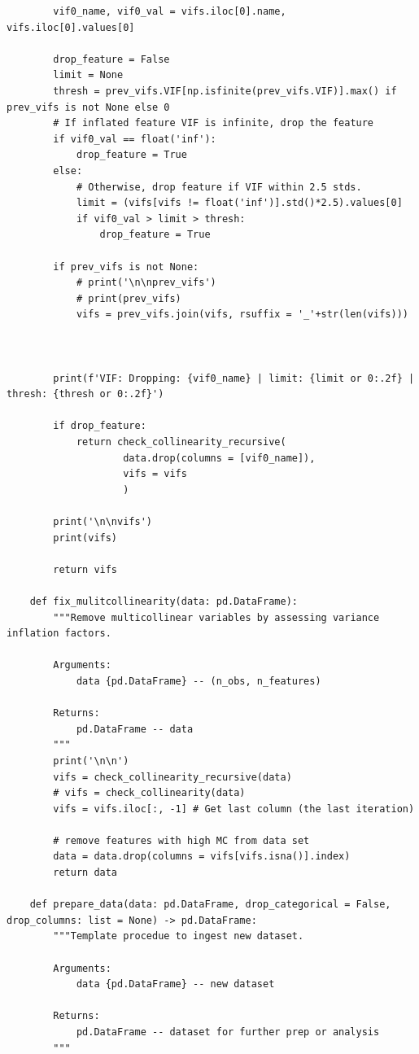 \begin{verbatim}
        vif0_name, vif0_val = vifs.iloc[0].name, vifs.iloc[0].values[0]

        drop_feature = False
        limit = None
        thresh = prev_vifs.VIF[np.isfinite(prev_vifs.VIF)].max() if prev_vifs is not None else 0
        # If inflated feature VIF is infinite, drop the feature
        if vif0_val == float('inf'):
            drop_feature = True
        else:
            # Otherwise, drop feature if VIF within 2.5 stds.
            limit = (vifs[vifs != float('inf')].std()*2.5).values[0]
            if vif0_val > limit > thresh:
                drop_feature = True

        if prev_vifs is not None:
            # print('\n\nprev_vifs')
            # print(prev_vifs)
            vifs = prev_vifs.join(vifs, rsuffix = '_'+str(len(vifs)))



        print(f'VIF: Dropping: {vif0_name} | limit: {limit or 0:.2f} | thresh: {thresh or 0:.2f}')

        if drop_feature:
            return check_collinearity_recursive(
                    data.drop(columns = [vif0_name]),
                    vifs = vifs
                    )

        print('\n\nvifs')
        print(vifs)

        return vifs

    def fix_mulitcollinearity(data: pd.DataFrame):
        """Remove multicollinear variables by assessing variance inflation factors.

        Arguments:
            data {pd.DataFrame} -- (n_obs, n_features)

        Returns:
            pd.DataFrame -- data
        """
        print('\n\n')
        vifs = check_collinearity_recursive(data)
        # vifs = check_collinearity(data)
        vifs = vifs.iloc[:, -1] # Get last column (the last iteration)

        # remove features with high MC from data set
        data = data.drop(columns = vifs[vifs.isna()].index)
        return data

    def prepare_data(data: pd.DataFrame, drop_categorical = False, drop_columns: list = None) -> pd.DataFrame:
        """Template procedue to ingest new dataset.

        Arguments:
            data {pd.DataFrame} -- new dataset

        Returns:
            pd.DataFrame -- dataset for further prep or analysis
        """


\end{verbatim}

